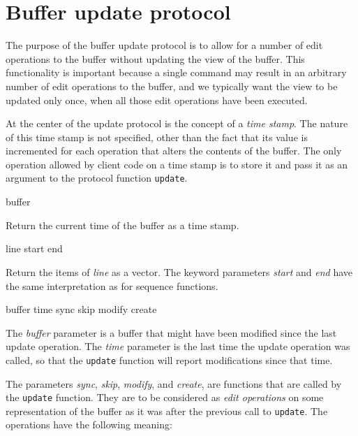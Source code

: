 \section{Buffer update protocol}
\label{sec-update-protocol}

The purpose of the buffer update protocol is to allow for a number of
edit operations to the buffer without updating the view of the buffer.
This functionality is important because a single command may result in
an arbitrary number of edit operations to the buffer, and we typically
want the view to be updated only once, when all those edit operations
have been executed.

At the center of the update protocol is the concept of a \emph{time
  stamp}.  The nature of this time stamp is not specified, other than
the fact that its value is incremented for each operation that alters
the contents of the buffer.  The only operation allowed by client code
on a time stamp is to store it and pass it as an argument to the
protocol function \texttt{update}.

 {buffer}

Return the current time of the buffer as a time stamp.

 {line \key start end}

Return the items of \textit{line} as a vector.  The keyword parameters
\textit{start} and \textit{end} have the same interpretation as for
\commonlisp{} sequence functions.

 {buffer time sync skip modify create}

The \textit{buffer} parameter is a buffer that might have been
modified since the last update operation.  The \textit{time} parameter
is the last time the update operation was called, so that the
\texttt{update} function will report modifications since that time. 

The parameters \textit{sync}, \textit{skip}, \textit{modify}, and
\textit{create}, are functions that are called by the \texttt{update}
function.  They are to be considered as \emph{edit operations} on some
representation of the buffer as it was after the previous call to
\texttt{update}.  The operations have the following meaning:

